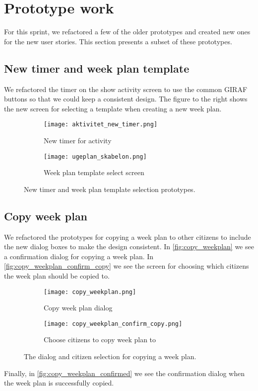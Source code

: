 \section{Prototype work}\label{sprint-3-prototypes}
For this sprint, we refactored a few of the older prototypes and created new ones for the new user stories.
This section presents a subset of these prototypes.

\subsection{New timer and week plan template}
We refactored the timer on the show activity screen to use the common GIRAF buttons so that we could keep a consistent design.
The figure to the right shows the new screen for selecting a template when creating a new week plan.
\begin{figure}[H]
    \begin{subfigure}{0.5\textwidth}
    \texttt{[image: aktivitet\_new\_timer.png]}
    \caption{New timer for activity}
    \label{fig:activity_new_timer}
    \end{subfigure}
    \begin{subfigure}{0.5\textwidth}
        \texttt{[image: ugeplan\_skabelon.png]}
    \caption{Week plan template select screen}
    \label{fig:weekplan_template_screen}
    \end{subfigure}
    \caption{New timer and week plan template selection prototypes.} 
    \label{activity_new_timer_and_weekplan_template_screen}
\end{figure}

\subsection{Copy week plan}
We refactored the prototypes for copying a week plan to other citizens to include the new dialog boxes to make the design consistent. In \autoref{fig:copy_weekplan} we see a confirmation dialog for copying a week plan. In \autoref{fig:copy_weekplan_confirm_copy} we see the screen for choosing which citizens the week plan should be copied to. 
\begin{figure}[H]
    \begin{subfigure}{0.5\textwidth}
    \texttt{[image: copy\_weekplan.png]} 
    \caption{Copy week plan dialog}
    \label{fig:copy_weekplan}
    \end{subfigure}
    \begin{subfigure}{0.5\textwidth}
        \texttt{[image: copy\_weekplan\_confirm\_copy.png]}
    \caption{Choose citizens to copy week plan to}
    \label{fig:copy_weekplan_confirm_copy}
    \end{subfigure} 
    \caption{The dialog and citizen selection for copying a week plan.}
    \label{fig:copy_weekplan_confirm_copy_and_copy_weekplan}
\end{figure}
\noindent
Finally, in \autoref{fig:copy_weekplan_confirmed} we see the confirmation dialog when the week plan is successfully copied.

